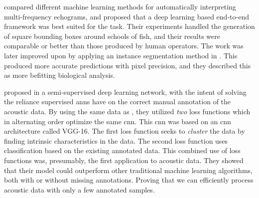 \citet{marques2021detecting} compared different machine learning methods for automatically interpreting multi-frequency echograms, and proposed that a deep learning based end-to-end framework was best suited for the task. Their experiments handled the generation of square bounding boxes around schools of fish, and their results were comparable or better than those produced by human operators. The work was later improved upon by applying an instance segmentation method in \citeyear{marques2021instance}\cite{marques2021instance}. This produced more accurate predictions with pixel precision, and they described this as more befitting biological analysis.
 
\citet{semtantic-segm2021choi} proposed in \citeyear{semtantic-segm2021choi} a semi-supervised deep learning network, with the intent of solving the reliance supervised \gls{ann}s have on the correct manual annotation of the acoustic data. By using the same data as \citet{brautaset2020acoustic}, they utilized \textit{two} loss functions which in alternating order optimize the same \gls{cnn}. This \gls{cnn} was based on an \gls{cnn} architecture called VGG-16\cite{simonyan2014very}. The first loss function seeks to \textit{cluster} the data by finding intrinsic characteristics in the data. The second loss function uses classification based on the existing annotated data. This combined use of loss functions was, presumably, the first application to acoustic data. They showed that their model could outperform other traditional machine learning algorithms, both with or without missing annotations. Proving that we can efficiently process acoustic data with only a few annotated samples.





%        









        
        
        
        
        

        
        
        
        
        
        

